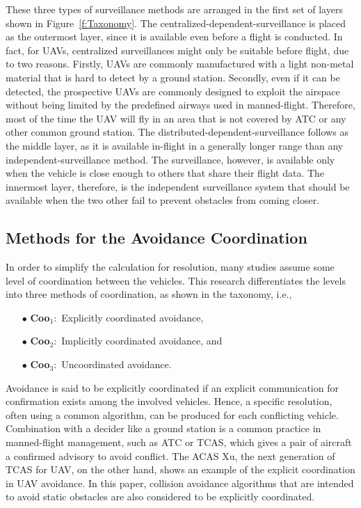These three types of surveillance methods are arranged in the first set of layers shown in Figure~\ref{f:Taxonomy}. The centralized-dependent-surveillance is placed as the outermost layer, since it is available even before a flight is conducted. In fact, for UAVs, centralized surveillances might only be suitable before flight, due to two reasons. Firstly, UAVs are commonly manufactured with a light non-metal material that is hard to detect by a ground station. Secondly, even if it can be detected, the prospective UAVs\cite{degarmo:04} are commonly designed to exploit the airspace without being limited by the predefined airways used in manned-flight. Therefore, most of the time the UAV will fly in an area that is not covered by ATC or any other common ground station. The distributed-dependent-surveillance follows as the middle layer, as it is available in-flight in a generally longer range than any independent-surveillance method. The surveillance, however, is available only when the vehicle is close enough to others that share their flight data. The innermost layer, therefore, is the independent surveillance system that should be available when the two other fail to prevent obstacles from coming closer.

\subsection{Methods for the Avoidance Coordination}
In order to simplify the calculation for resolution, many studies assume some level of coordination between the vehicles. This research differentiates the levels into three methods of coordination, as shown in the taxonomy, i.e., 
\begin{itemize}[labelindent=\parindent,leftmargin=5pc]
	\item[$\bullet$ \textbf{Coo}$_1:$] Explicitly coordinated avoidance,
	\item[$\bullet$ \textbf{Coo}$_2:$] Implicitly coordinated avoidance, and
	\item[$\bullet$ \textbf{Coo}$_3:$] Uncoordinated avoidance.
\end{itemize}

Avoidance is said to be explicitly coordinated if an explicit communication for confirmation exists among the involved vehicles. Hence, a specific resolution, often using a common algorithm, can be produced for each conflicting vehicle. Combination with a decider like a ground station is a common practice in manned-flight management, such as ATC or TCAS, which gives a pair of aircraft a confirmed advisory to avoid conflict. The ACAS Xu\cite{Kochenderfer:12}, the next generation of TCAS for UAV, on the other hand, shows an example of the explicit coordination in UAV avoidance. In this paper, collision avoidance algorithms that are intended to avoid static obstacles are also considered to be explicitly coordinated.

